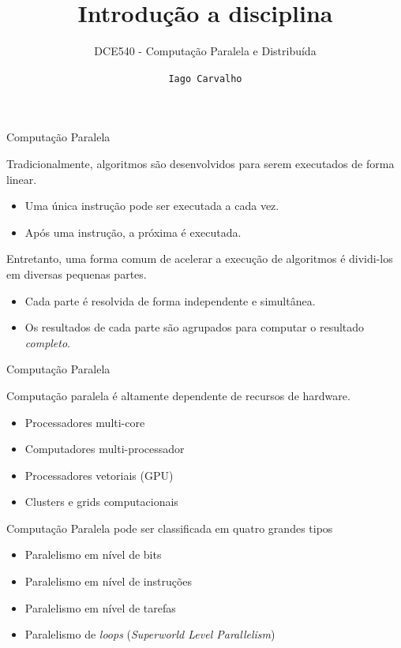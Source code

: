 \documentclass[compress]{beamer}
\title{Introdução a disciplina}
\subtitle{DCE540 - Computação Paralela e Distribuída}
\author{\texttt{Iago Carvalho}}
\institute{\texttt{Departamento de Ciência da Computação}}
\begin{document}
\begin{frame}
\titlepage

\end{frame}


\begin{frame}{Computação Paralela}

Tradicionalmente, algoritmos são desenvolvidos para serem executados de forma linear.
\begin{itemize}
    \item Uma única instrução pode ser executada a cada vez.
    \item Após uma instrução, a próxima é executada.
\end{itemize}

\vspace{1cm}

Entretanto, uma forma comum de acelerar a execução de algoritmos é dividi-los em diversas pequenas partes.
\begin{itemize}
    \item Cada parte é resolvida de forma independente e simultânea.
    \item Os resultados de cada parte são agrupados para computar o resultado \textit{completo}.
\end{itemize}



\end{frame}


\begin{frame}{Computação Paralela}

Computação paralela é altamente dependente de recursos de hardware.
\begin{itemize}
    \item Processadores multi-core
    \item Computadores multi-processador
    \item Processadores vetoriais (GPU)
    \item Clusters e grids computacionais
\end{itemize}

\vspace{0.5cm}

Computação Paralela pode ser classificada em quatro grandes tipos
\begin{itemize}
    \item Paralelismo em nível de bits
    \item Paralelismo em nível de instruções
    \item Paralelismo em nível de tarefas
    \item Paralelismo de \textit{loops} (\textit{Superworld Level Parallelism})
\end{itemize}
\end{frame}
\end{document}
